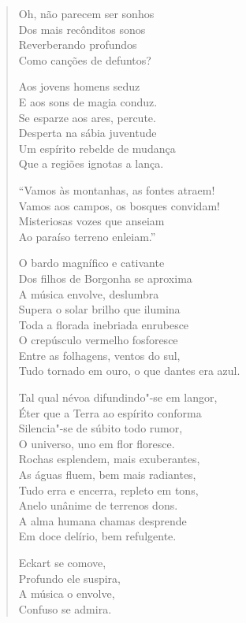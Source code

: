 \begin{verse}
Oh, não parecem ser sonhos\\
Dos mais recônditos sonos\\
Reverberando profundos\\
Como canções de defuntos?

Aos jovens homens seduz\\
E aos sons de magia conduz.\\
Se esparze aos ares, percute.\\
Desperta na sábia juventude\\
Um espírito rebelde de mudança\\
Que a regiões ignotas a lança.

``Vamos às montanhas, as fontes atraem!\\
Vamos aos campos, os bosques convidam!\\
Misteriosas vozes que anseiam\\
Ao paraíso terreno enleiam.''

O bardo magnífico e cativante\\
Dos filhos de Borgonha se aproxima\\
A música envolve, deslumbra\\
Supera o solar brilho que ilumina\\
Toda a florada inebriada enrubesce\\
O crepúsculo vermelho fosforesce\\
Entre as folhagens, ventos do sul,\\
Tudo tornado em ouro, o que dantes era azul.

Tal qual névoa difundindo"-se em langor,\\
Éter que a Terra ao espírito conforma\\
Silencia"-se de súbito todo rumor,\\
O universo, uno em flor floresce.\\
Rochas esplendem, mais exuberantes,\\
As águas fluem, bem mais radiantes,\\
Tudo erra e encerra, repleto em tons,\\
Anelo unânime de terrenos dons.\\
A alma humana chamas desprende\\
Em doce delírio, bem refulgente.

Eckart se comove,\\
Profundo ele suspira,\\
A música o envolve,\\
Confuso se admira.


\end{verse}
